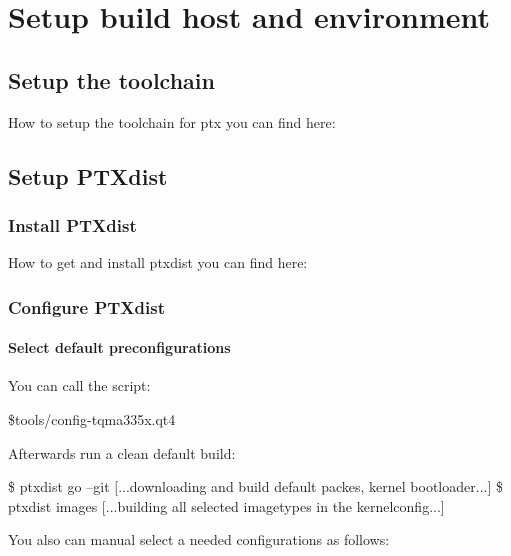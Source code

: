\chapter{Setup build host and environment }%
\label{cha:Setup}

\section{Setup the toolchain}%
\label{sec:Setup the toolchain}
How to setup the toolchain for ptx you can find here: \cite{todo}


\section{Setup PTXdist}%
\label{sec:Setup PTXdist}
\subsection{Install PTXdist}%
\label{sub:Install PTXdist}
How to get and install ptxdist you can find here: \cite{todo}


\subsection{Configure PTXdist}%
\label{sub:Configure PTXdist}


\subsubsection{Select default preconfigurations}%
\label{ssub:default configuration}
You can call the script:
\begin{listing}[{language=bash, caption={Q-Systems enviroment setup script}]
    \$tools/config-tqma335x.qt4
\end{listing}

Afterwards run a clean default build:
        \begin{listing}[language=bash]
            \$  ptxdist go --git
				[...downloading and build default packes, kernel bootloader...]
            \$  ptxdist images
				[...building all selected imagetypes in the  kernelconfig...]
        \end{listing}

You also can manual select a needed configurations as follows:

